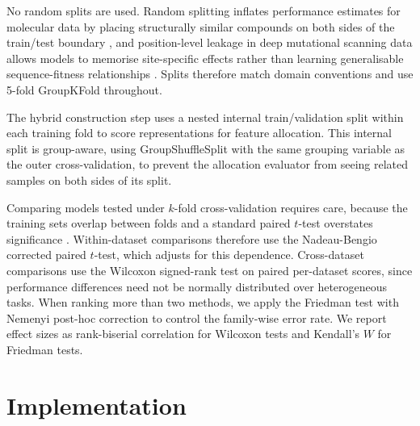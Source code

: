 {%
No random splits are used. Random splitting inflates performance estimates for molecular data by placing structurally similar compounds on both sides of the train/test boundary \citep{Yang2019, Wallach2018}, and position-level leakage in deep mutational scanning data allows models to memorise site-specific effects rather than learning generalisable sequence-fitness relationships \citep{Notin2023, Vieira2026}. Splits therefore match domain conventions and use 5-fold GroupKFold throughout.


The hybrid construction step uses a nested internal train/validation split within each training fold to score representations for feature allocation. This internal split is group-aware, using GroupShuffleSplit with the same grouping variable as the outer cross-validation, to prevent the allocation evaluator from seeing related samples on both sides of its split.

Comparing models tested under $k$-fold cross-validation requires care, because the training sets overlap between folds and a standard paired $t$-test overstates significance \citep{NadeauBengio2003}. Within-dataset comparisons therefore use the Nadeau-Bengio corrected paired $t$-test, which adjusts for this dependence. Cross-dataset comparisons use the Wilcoxon signed-rank test on paired per-dataset scores, since performance differences need not be normally distributed over heterogeneous tasks. When ranking more than two methods, we apply the Friedman test with Nemenyi post-hoc correction \citep{Demsar2006} to control the family-wise error rate. We report effect sizes as rank-biserial correlation for Wilcoxon tests and Kendall's $W$ for Friedman tests.


\section{Implementation}

}
